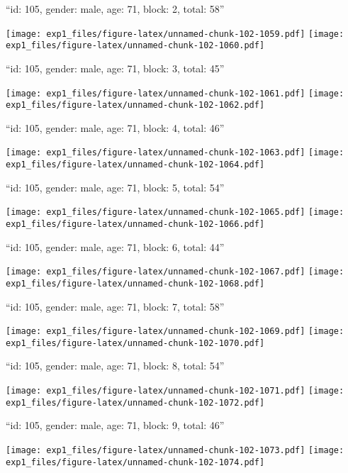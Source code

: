 \documentclass[11pt,,]{article}
\begin{document}
\newpage
[1] 

``id: 105, gender: male, age: 71, block: 2, total: 58''

\texttt{[image: exp1\_files/figure-latex/unnamed-chunk-102-1059.pdf]}
\texttt{[image: exp1\_files/figure-latex/unnamed-chunk-102-1060.pdf]}

\newpage
[1] 

``id: 105, gender: male, age: 71, block: 3, total: 45''

\texttt{[image: exp1\_files/figure-latex/unnamed-chunk-102-1061.pdf]}
\texttt{[image: exp1\_files/figure-latex/unnamed-chunk-102-1062.pdf]}

\newpage
[1] 

``id: 105, gender: male, age: 71, block: 4, total: 46''

\texttt{[image: exp1\_files/figure-latex/unnamed-chunk-102-1063.pdf]}
\texttt{[image: exp1\_files/figure-latex/unnamed-chunk-102-1064.pdf]}

\newpage
[1] 

``id: 105, gender: male, age: 71, block: 5, total: 54''

\texttt{[image: exp1\_files/figure-latex/unnamed-chunk-102-1065.pdf]}
\texttt{[image: exp1\_files/figure-latex/unnamed-chunk-102-1066.pdf]}

\newpage
[1] 

``id: 105, gender: male, age: 71, block: 6, total: 44''

\texttt{[image: exp1\_files/figure-latex/unnamed-chunk-102-1067.pdf]}
\texttt{[image: exp1\_files/figure-latex/unnamed-chunk-102-1068.pdf]}

\newpage
[1] 

``id: 105, gender: male, age: 71, block: 7, total: 58''

\texttt{[image: exp1\_files/figure-latex/unnamed-chunk-102-1069.pdf]}
\texttt{[image: exp1\_files/figure-latex/unnamed-chunk-102-1070.pdf]}

\newpage
[1] 

``id: 105, gender: male, age: 71, block: 8, total: 54''

\texttt{[image: exp1\_files/figure-latex/unnamed-chunk-102-1071.pdf]}
\texttt{[image: exp1\_files/figure-latex/unnamed-chunk-102-1072.pdf]}

\newpage
[1] 

``id: 105, gender: male, age: 71, block: 9, total: 46''

\texttt{[image: exp1\_files/figure-latex/unnamed-chunk-102-1073.pdf]}
\texttt{[image: exp1\_files/figure-latex/unnamed-chunk-102-1074.pdf]}
\end{document}
